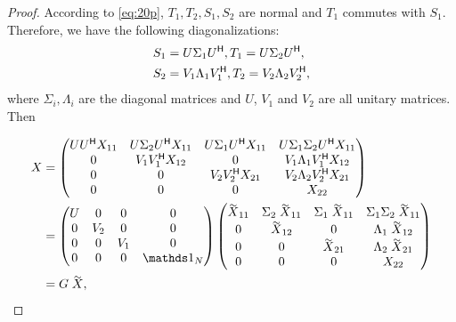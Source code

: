 \begin{proof}
According to \cref{eq:20p},   $ T_1,T_2,S_1,S_2$ are normal and $T_1$ commutes with $S_1$. Therefore, we have the
following   diagonalizations:
  \begin{equation}
    \label{eq:21p}
    \begin{split}
      S_1   & = U   \Sigma_{1}  U^{\mathsf{H}},  T_1  = U   \Sigma_{2}  U^{\mathsf{H}},\\
      S_2  & = V_1 \Lambda_{1} V^{\mathsf{H}}_1
      ,  T_2  = V_2 \Lambda_2 V^{\mathsf{H}}_2,\\
    \end{split}
  \end{equation}
  where $\Sigma_i,\Lambda_i$ are the diagonal matrices and $U$, $V_1$ and $V_2$ are
  all unitary matrices.  Then
  
  \begin{equation}
    \label{eq:22p}
    \begin{split}
      X &=
      \begin{pmatrix}
        U \adj U X_{11} &  U \Sigma_2 \adj U X_{11} & U \Sigma_1 \adj U  X_{11} & U\Sigma_1\Sigma_2 \adj U X_{11} \\
        0 &  V_1 \adj V_1 X_{12} & 0 & V_1 \Lambda_1 \adj V_1 X_{12}\\
        0 & 0 & V_2 \adj V_2 X_{21} &  V_2 \Lambda_2\adj V_2X_{21}\\
        0 & 0 & 0 & X_{22}\\
      \end{pmatrix}                    \\
      & =
      \begin{pmatrix}
        U & 0 & 0 &0 \\
        0 & V_2 & 0 &0 \\
        0 & 0 & V_1 & 0 \\
        0 & 0 & 0 & \I_N\\
      \end{pmatrix}
      \begin{pmatrix}
        \tilde X_{11} &   \Sigma_2\tilde X_{11} & \Sigma_1 \tilde X_{11} & \Sigma_1\Sigma_{2} \tilde X_{11} \\
        0 &  \tilde X_{12} & 0 &  \Lambda_1 \tilde X_{12}\\
        0 & 0 &  \tilde X_{21} &   \Lambda_2\tilde X_{21}\\
        0 & 0 & 0 & X_{22}\\
      \end{pmatrix}\\
      & = G \tilde X,
    \end{split}
  \end{equation}
 

\end{proof}
